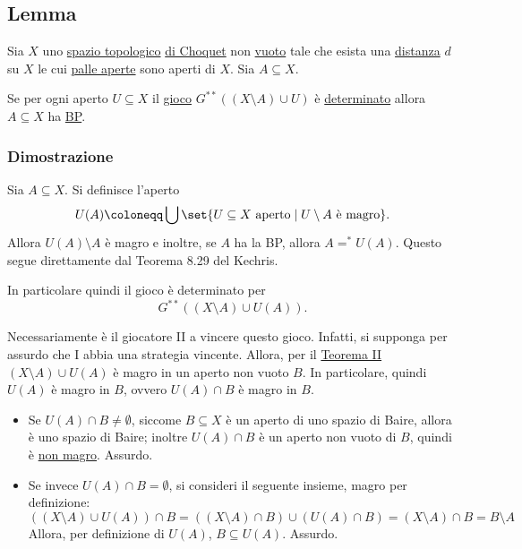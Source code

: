 \documentclass{article}
\newcommand{\1}{\mathds{1}}
\begin{document}
\subsection{Lemma}
\label{sec:org29f61ee}

Sia \(X\) uno \href{../../../../../../../org/roam/20250103145124-topologia.org}{spazio topologico} \hyperref[sec:org12a4e1c]{di Choquet} non \href{../../../../../../../org/roam/20250131161811-insieme_vuoto_mk.org}{vuoto} tale che esista una \href{../../../../../../../org/roam/20250301193511-spazio_metrico.org}{distanza} \(d\) su \(X\) le cui \href{../../../../../../../org/roam/20250301193511-spazio_metrico.org}{palle aperte} sono aperti di \(X\). Sia \(A \subseteq X\).

Se per ogni aperto \(U \subseteq X\) il \hyperref[sec:orge8e0b9e]{gioco} \(G^{**}\left((X\setminus A)\cup U\right)\) è \hyperref[sec:org7f68e17]{determinato} allora \(A \subseteq X\) ha \href{../../../../../../../org/roam/20250514154039-proprieta_di_baire.org}{BP}.
\subsubsection{Dimostrazione}
\label{sec:orga50e260}

Sia \(A \subseteq X\). Si definisce l'aperto
\begin{equation*}
U(A) \coloneqq \bigcup \set{
U\subseteq X\text{ aperto}\mid U\setminus A\text{ è magro}
}.
\end{equation*}
Allora \(U(A)\setminus A\) è magro e inoltre, se \(A\) ha la BP, allora \(A\mathrel{=^{*}} U(A)\). Questo segue direttamente dal Teorema 8.29 del Kechris.

In particolare quindi il gioco è determinato  per
\begin{equation*}
G^{**}\left((X\setminus A)\cup U(A)\right).
\end{equation*}

Necessariamente è il giocatore II a vincere questo gioco. Infatti, si supponga per assurdo che I abbia una strategia vincente. Allora, per il \href{../../../../../../../org/roam/20250514174717-teorema_di_caratterizzazione_dei_comagri_tramite_il_gioco_di_banach_mazur.org}{Teorema II} \((X\setminus A)\cup U(A)\) è magro in un aperto non vuoto \(B\). In particolare, quindi \(U(A)\) è magro in \(B\), ovvero \(U(A)\cap B\) è magro in \(B\).
\begin{itemize}
\item Se \(U(A)\cap B\neq\emptyset\), siccome \(B \subseteq X\) è un aperto di uno spazio di Baire, allora è uno spazio di Baire; inoltre \(U(A)\cap B\) è un aperto non vuoto di \(B\), quindi è \uline{non magro}. Assurdo.
\item Se invece \(U(A)\cap B = \emptyset\), si consideri il seguente insieme, magro per definizione:
\begin{equation*}
  \left((X\setminus A)\cup U(A)\right) \cap B = \left((X\setminus A)\cap B\right) \cup \left(U(A)\cap B\right) = (X\setminus A)\cap B = B\setminus A
\end{equation*}
Allora, per definizione di \(U(A)\), \(B \subseteq U(A)\). Assurdo.
\end{itemize}
\end{document}
